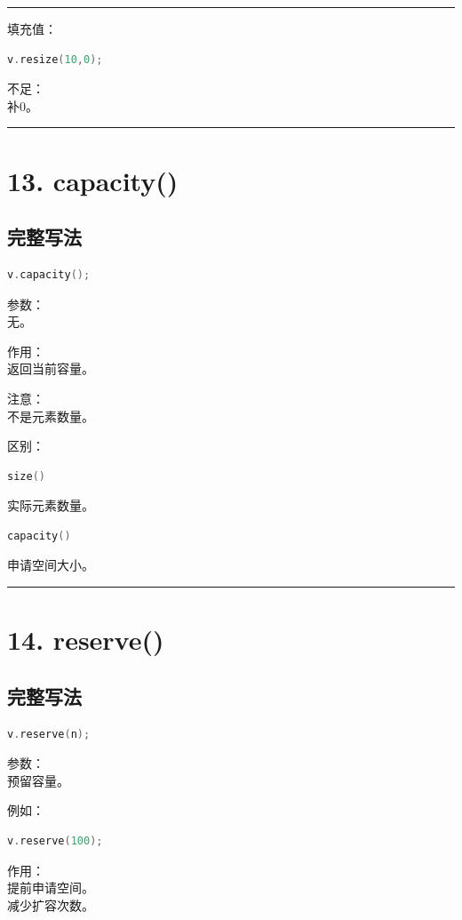 \documentclass[9pt,twocolumn]{extarticle}
\begin{document}
\noindent\rule{\linewidth}{0.4pt}

填充值：
\begin{lstlisting}[language=C++]
v.resize(10,0);
\end{lstlisting}
不足：\\
补0。

\noindent\rule{\linewidth}{0.4pt}

\section{13. capacity()}

\subsection{完整写法}
\begin{lstlisting}[language=C++]
v.capacity();
\end{lstlisting}
参数：\\
无。

作用：\\
返回当前容量。

注意：\\
不是元素数量。

区别：
\begin{lstlisting}[language=C++]
size()
\end{lstlisting}
实际元素数量。
\begin{lstlisting}[language=C++]
capacity()
\end{lstlisting}
申请空间大小。

\noindent\rule{\linewidth}{0.4pt}

\section{14. reserve()}

\subsection{完整写法}
\begin{lstlisting}[language=C++]
v.reserve(n);
\end{lstlisting}
参数：\\
预留容量。

例如：
\begin{lstlisting}[language=C++]
v.reserve(100);
\end{lstlisting}
作用：\\
提前申请空间。\\
减少扩容次数。
\end{document}
